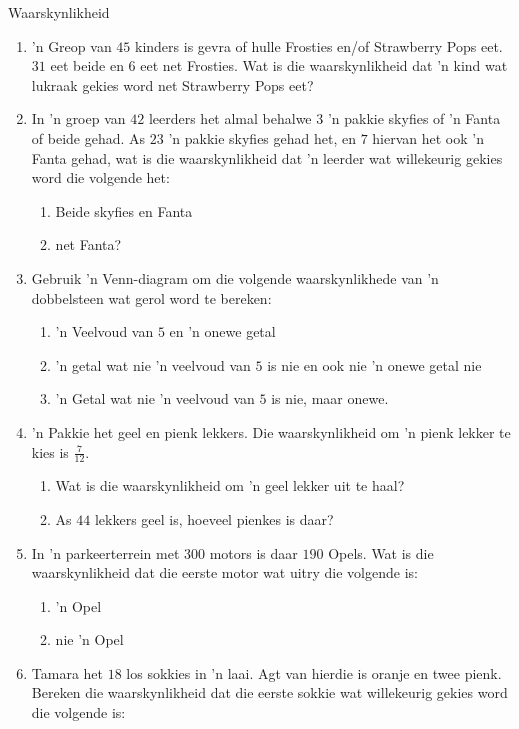 \begin{eoexercises}{Waarskynlikheid}
  \begin{enumerate}[itemsep=5pt, label=\textbf{\arabic*}]
  \item 'n Greop van $45$ kinders is gevra of hulle  Frosties en/of
    Strawberry Pops eet. $31$ eet beide en $6$ eet net Frosties.  Wat is die waarskynlikheid dat 'n kind wat lukraak gekies word net Strawberry
    Pops eet?
  \item In 'n groep van $42$ leerders het almal behalwe $3$ 'n pakkie skyfies of 'n Fanta of beide gehad. As $23$ 'n pakkie skyfies gehad het, en $7$ hiervan het ook 'n Fanta gehad, wat is die waarskynlikheid dat 'n leerder wat willekeurig gekies word die volgende het:
    \begin{enumerate}
    \item Beide skyfies en Fanta
    \item net Fanta?
    \end{enumerate}
  \item Gebruik 'n Venn-diagram om die volgende waarskynlikhede van 'n dobbelsteen wat gerol word te bereken:
    \begin{enumerate}
    \item 'n Veelvoud van $5$ en 'n onewe getal
    \item 'n getal wat nie 'n veelvoud van $5$ is nie en ook nie 'n onewe getal nie
    \item 'n Getal wat nie 'n veelvoud van $5$ is nie, maar onewe.
    \end{enumerate}
  \item 'n Pakkie het geel en pienk lekkers. Die waarskynlikheid om 'n pienk lekker te kies is $\frac{7}{12}$.
    \begin{enumerate}
    \item Wat is die waarskynlikheid om 'n geel lekker uit te haal?
    \item As $44$ lekkers geel is, hoeveel pienkes is daar?
    \end{enumerate}
  \item In 'n parkeerterrein met $300$ motors is daar $190$ Opels. Wat is die waarskynlikheid dat die eerste motor wat uitry die volgende is:
    \begin{enumerate}
    \item 'n Opel
    \item nie 'n Opel
    \end{enumerate}
  \item Tamara het $18$ los sokkies in 'n laai. Agt van hierdie is oranje en twee pienk. Bereken die waarskynlikheid dat die eerste sokkie wat willekeurig gekies word die volgende is:

\end{enumerate}
\end{eoexercises}
